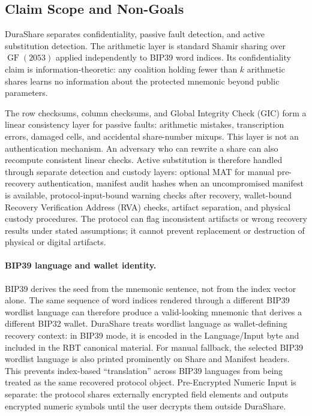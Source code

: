 \documentclass[11pt]{article}
\newcommand{\GF}{\operatorname{GF}}
\begin{document}
\subsection{Claim Scope and Non-Goals}
\label{sec:claim-scope}

DuraShare separates confidentiality, passive fault detection, and active substitution detection. The arithmetic layer is standard Shamir sharing over $\GF(2053)$ applied independently to BIP39 word indices. Its confidentiality claim is information-theoretic: any coalition holding fewer than $k$ arithmetic shares learns no information about the protected mnemonic beyond public parameters.

The row checksums, column checksums, and Global Integrity Check (GIC) form a linear consistency layer for passive faults: arithmetic mistakes, transcription errors, damaged cells, and accidental share-number mixups. This layer is not an authentication mechanism. An adversary who can rewrite a share can also recompute consistent linear checks. Active substitution is therefore handled through separate detection and custody layers: optional MAT for manual pre-recovery authentication, manifest audit hashes when an uncompromised manifest is available, protocol-input-bound warning checks after recovery, wallet-bound Recovery Verification Address (RVA) checks, artifact separation, and physical custody procedures. The protocol can flag inconsistent artifacts or wrong recovery results under stated assumptions; it cannot prevent replacement or destruction of physical or digital artifacts.

\paragraph{BIP39 language and wallet identity.} BIP39 derives the seed from the mnemonic sentence, not from the index vector alone. The same sequence of word indices rendered through a different BIP39 wordlist language can therefore produce a valid-looking mnemonic that derives a different BIP32 wallet. DuraShare treats wordlist language as wallet-defining recovery context: in BIP39 mode, it is encoded in the Language/Input byte and included in the RBT canonical material. For manual fallback, the selected BIP39 wordlist language is also printed prominently on Share and Manifest headers. This prevents index-based ``translation'' across BIP39 languages from being treated as the same recovered protocol object. Pre-Encrypted Numeric Input is separate: the protocol shares externally encrypted field elements and outputs encrypted numeric symbols until the user decrypts them outside DuraShare.
\end{document}
